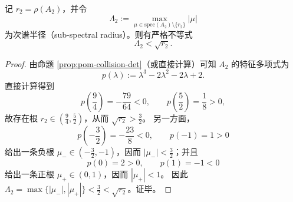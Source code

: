 \begin{proposition}\label{prop:pom-a2-strict-rh-certificate}
记 \(r_2=\rho(A_2)\)，并令
\[
\Lambda_2:=\max_{\mu\in\mathrm{spec}(A_2)\setminus\{r_2\}}|\mu|
\]
为次谱半径（sub-spectral radius）。则有严格不等式
\[
\boxed{\;\Lambda_2<\sqrt{r_2}.\;}
\]
\end{proposition}
\begin{proof}
由命题 \ref{prop:pom-collision-det}（或直接计算）可知 \(A_2\) 的特征多项式为
\[
p(\lambda):=\lambda^3-2\lambda^2-2\lambda+2.
\]
直接计算得到
\[
p\!\left(\frac94\right)=-\frac{79}{64}<0,\qquad
p\!\left(\frac52\right)=\frac18>0,
\]
故存在根 \(r_2\in\left(\frac94,\frac52\right)\)，从而 \(\sqrt{r_2}>\frac32\)。
另一方面，
\[
p\!\left(-\frac32\right)=-\frac{23}{8}<0,\qquad p(-1)=1>0
\]
给出一条负根 \(\mu_-\in\left(-\frac32,-1\right)\)，因而 \(|\mu_-|<\frac32\)；并且
\[
p(0)=2>0,\qquad p(1)=-1<0
\]
给出一条正根 \(\mu_+\in(0,1)\)，因而 \(|\mu_+|<1\)。
因此 \(\Lambda_2=\max\{|\mu_-|,|\mu_+|\}<\frac32<\sqrt{r_2}\)。证毕。
\end{proof}

